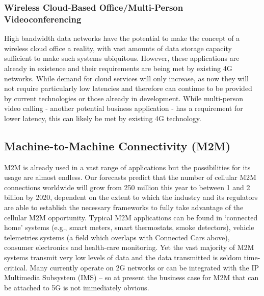 \subsubsection{Wireless Cloud-Based Office/Multi-Person Videoconferencing}

High bandwidth data networks have the potential to make the concept of a wireless cloud office a reality, with vast amounts of data storage capacity sufficient to make such systems ubiquitous. However, these applications are already in existence and their requirements are being met by existing 4G networks. While demand for cloud services will only increase, as now they will not require particularly low latencies and therefore can continue to be provided by current technologies or those already in development. While multi-person video calling - another potential business application - has a requirement for lower latency, this can likely be met by existing 4G technology.

\subsection{Machine-to-Machine Connectivity (M2M)}
M2M is already used in a vast range of applications but the possibilities for its usage are almost endless. Our forecasts predict that the number of cellular M2M connections worldwide will grow from 250 million this year to between 1 and 2 billion by 2020, dependent on the extent to which the industry and its regulators are able to establish the necessary frameworks to fully take advantage of the cellular M2M opportunity. Typical M2M applications can be found in ‘connected home’ systems (e.g., smart meters, smart thermostats, smoke detectors), vehicle telemetries systems (a field which overlaps with Connected Cars above), consumer electronics and health-care monitoring. Yet the vast majority of M2M systems transmit very low levels of data and the data transmitted is seldom time-critical. Many currently operate on 2G networks or can be integrated with the IP Multimedia Subsystem (IMS) – so at present the business case for M2M that can be attached to 5G is not immediately obvious.


